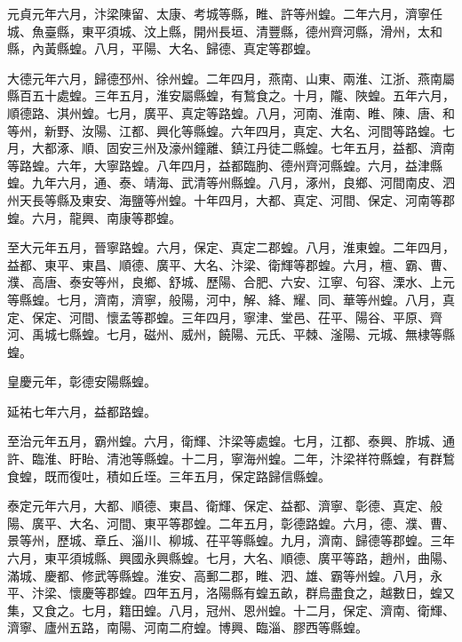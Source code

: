 \begin{pinyinscope}
 元貞元年六月，汴梁陳留、太康、考城等縣，睢、許等州蝗。二年六月，濟寧任城、魚臺縣，東平須城、汶上縣，開州長垣、清豐縣，德州齊河縣，滑州，太和縣，內黃縣蝗。八月，平陽、大名、歸德、真定等郡蝗。



 大德元年六月，歸德邳州、徐州蝗。二年四月，燕南、山東、兩淮、江浙、燕南屬縣百五十處蝗。三年五月，淮安屬縣蝗，有鶖食之。十月，隴、陜蝗。五年六月，順德路、淇州蝗。七月，廣平、真定等路蝗。八月，河南、淮南、睢、陳、唐、和等州，新野、汝陽、江都、興化等縣蝗。六年四月，真定、大名、河間等路蝗。七月，大都涿、順、固安三州及濠州鐘離、鎮江丹徒二縣蝗。七年五月，益都、濟南等路蝗。六年，大寧路蝗。八年四月，益都臨朐、德州齊河縣蝗。六月，益津縣蝗。九年六月，通、泰、靖海、武清等州縣蝗。八月，涿州，良鄉、河間南皮、泗州天長等縣及東安、海鹽等州蝗。十年四月，大都、真定、河間、保定、河南等郡蝗。六月，龍興、南康等郡蝗。



 至大元年五月，晉寧路蝗。六月，保定、真定二郡蝗。八月，淮東蝗。二年四月，益都、東平、東昌、順德、廣平、大名、汴梁、衛輝等郡蝗。六月，檀、霸、曹、濮、高唐、泰安等州，良鄉、舒城、歷陽、合肥、六安、江寧、句容、溧水、上元等縣蝗。七月，濟南，濟寧，般陽，河中，解、絳、耀、同、華等州蝗。八月，真定、保定、河間、懷孟等郡蝗。三年四月，寧津、堂邑、茌平、陽谷、平原、齊河、禹城七縣蝗。七月，磁州、威州，饒陽、元氏、平棘、滏陽、元城、無棣等縣蝗。



 皇慶元年，彰德安陽縣蝗。



 延祐七年六月，益都路蝗。



 至治元年五月，霸州蝗。六月，衛輝、汴梁等處蝗。七月，江都、泰興、胙城、通許、臨淮、盱眙、清池等縣蝗。十二月，寧海州蝗。二年，汴梁祥符縣蝗，有群鶖食蝗，既而復吐，積如丘垤。三年五月，保定路歸信縣蝗。



 泰定元年六月，大都、順德、東昌、衛輝、保定、益都、濟寧、彰德、真定、般陽、廣平、大名、河間、東平等郡蝗。二年五月，彰德路蝗。六月，德、濮、曹、景等州，歷城、章丘、淄川、柳城、茌平等縣蝗。九月，濟南、歸德等郡蝗。三年六月，東平須城縣、興國永興縣蝗。七月，大名、順德、廣平等路，趙州，曲陽、滿城、慶都、修武等縣蝗。淮安、高郵二郡，睢、泗、雄、霸等州蝗。八月，永平、汴梁、懷慶等郡蝗。四年五月，洛陽縣有蝗五畝，群烏盡食之，越數日，蝗又集，又食之。七月，籍田蝗。八月，冠州、恩州蝗。十二月，保定、濟南、衛輝、濟寧、廬州五路，南陽、河南二府蝗。博興、臨淄、膠西等縣蝗。




\end{pinyinscope}

